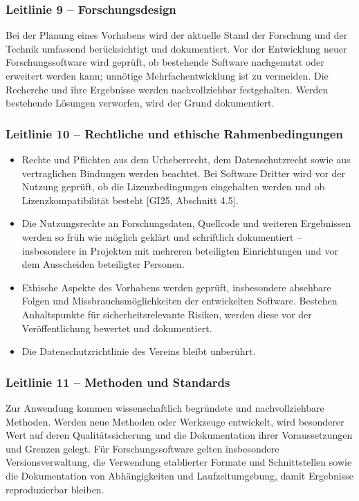 \documentclass[a4paper, fontsize=11pt]{scrartcl}
\begin{document}
\subsubsection*{Leitlinie 9 -- Forschungsdesign}
Bei der Planung eines Vorhabens wird der aktuelle Stand der Forschung und der Technik umfassend berücksichtigt und dokumentiert. Vor der Entwicklung neuer Forschungssoftware wird geprüft, ob bestehende Software nachgenutzt oder erweitert werden kann; unnötige Mehrfachentwicklung ist zu vermeiden. Die Recherche und ihre Ergebnisse werden nachvollziehbar festgehalten. Werden bestehende Lösungen verworfen, wird der Grund dokumentiert.

\subsubsection*{Leitlinie 10 -- Rechtliche und ethische Rahmenbedingungen}
\begin{itemize}
  \item Rechte und Pflichten aus dem Urheberrecht, dem Datenschutzrecht sowie aus vertraglichen Bindungen werden beachtet. Bei Software Dritter wird vor der Nutzung geprüft, ob die Lizenzbedingungen eingehalten werden und ob Lizenzkompatibilität besteht [GI25, Abschnitt 4.5].
  \item Die Nutzungsrechte an Forschungsdaten, Quellcode und weiteren Ergebnissen werden so früh wie möglich geklärt und schriftlich dokumentiert -- insbesondere in Projekten mit mehreren beteiligten Einrichtungen und vor dem Ausscheiden beteiligter Personen.
  \item Ethische Aspekte des Vorhabens werden geprüft, insbesondere absehbare Folgen und Missbrauchsmöglichkeiten der entwickelten Software. Bestehen Anhaltspunkte für sicherheitsrelevante Risiken, werden diese vor der Veröffentlichung bewertet und dokumentiert.
  \item Die Datenschutzrichtlinie des Vereins bleibt unberührt.
\end{itemize}

\subsubsection*{Leitlinie 11 -- Methoden und Standards}
Zur Anwendung kommen wissenschaftlich begründete und nachvollziehbare Methoden. Werden neue Methoden oder Werkzeuge entwickelt, wird besonderer Wert auf deren Qualitätssicherung und die Dokumentation ihrer Voraussetzungen und Grenzen gelegt. Für Forschungssoftware gelten insbesondere Versionsverwaltung, die Verwendung etablierter Formate und Schnittstellen sowie die Dokumentation von Abhängigkeiten und Laufzeitumgebung, damit Ergebnisse reproduzierbar bleiben.
\end{document}
